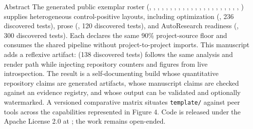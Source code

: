 \documentclass[
  ignorenonframetext,
]{beamer}
\begin{document}
\begin{frame}{Abstract}
The generated public exemplar roster
(,
,
,
,
,
,
,
,
,
,
,
,
,
,
,
,
,
,
,
,
,
,
) supplies heterogeneous
control-positive layouts, including optimization
(, 236 discovered tests), prose
(, 120 discovered tests), and
AutoResearch readiness (, 300
discovered tests). Each declares the same 90\% project-source floor and
consumes the shared pipeline without project-to-project imports. This
manuscript adds a reflexive artifact:  (138
discovered tests) follows the same analysis and render path while
injecting repository counters and figures from live introspection. The
result is a self-documenting build whose quantitative repository claims
are generated artifacts, whose manuscript claims are checked against an
evidence registry, and whose output can be validated and optionally
watermarked. A versioned comparative matrix situates \texttt{template/}
against peer tools across the capabilities represented in Figure 4. Code
is released under the Apache License 2.0 at
; the work remains open-ended.
\end{frame}
\end{document}

